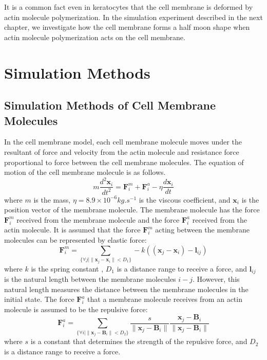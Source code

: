 \documentclass[a4paper,12pt]{book}
\begin{document}
It is a common fact even in keratocytes that the cell membrane is deformed by actin molecule polymerization. In the simulation experiment described in the next chapter, we investigate how the cell membrane forms a half moon shape when actin molecule polymerization acts on the cell membrane.


\chapter{Simulation Methods}
\section{Simulation Methods of Cell Membrane Molecules}
In the cell membrane model, each cell membrane molecule moves under the resultant of force and velocity from the actin molecule and resistance force proportional to force between the cell membrane molecules. The equation of motion of the cell membrane molecule is as follows.
\begin{equation}
m\frac{d^2\bm{x}_i}{dt^2} = \bm{F}^m_i +  \bm{F}^a_i - \eta \frac{d\bm{x}_i}{dt}
\end{equation}
where  $m$ is the mass, $\eta = 8.9\times 10^{-6} \si{kg.s^{-1}}$ is the viscous coefficient, and $\bm{x}_i$ is the position vector of the membrane molecule. The membrane molecule has the force  $\bm{F}^m_i$ received from the membrane molecule and the force  $\bm{F}^a_i$ received from the actin molecule. It is assumed that the force  $\bm{F}^m_i$ acting between the membrane molecules can be represented by elastic force:
\begin{equation}
\bm{F}^m_i = \sum_{\{ \forall j | \| \bm{x}_j - \bm{x}_i \|<D_1\}} -k((\bm{x}_j -\bm{x}_i )-\bm{l}_{ij} )
\end{equation}
where $k$ is the spring constant , $D_1$ is a distance range to receive a force, and $\bm{l}_{ij}$ is the natural length between the membrane molecules $i-j$. However, this natural length measures the distance between the membrane molecules in the initial state. The force  $\bm{F}^a_i$ that a membrane molecule receives from an actin molecule is assumed to be the repulsive force:
\begin{equation}
\bm{F}^a_i = \sum_{\{ \forall i | \| \bm{x}_j - \bm{B}_i \|<D_2\}} \frac{s}{\|\bm{x}_j -\bm{B}_i \|} \frac{\bm{x}_j -\bm{B}_i }{\|\bm{x}_j -\bm{B}_i \|}
\end{equation}
where $s$ is a constant that determines the strength of the repulsive force, and $D_2$ is a distance range to receive a force.
\end{document}
